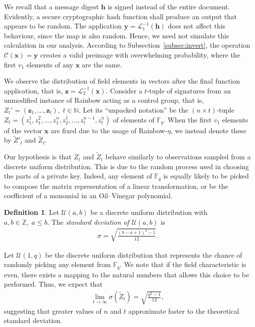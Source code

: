 \documentclass[12pt, a4paper, oneside]{memoir}
\theoremstyle{definition}
\newtheorem{definition}[theorem]{Definition}
\begin{document}
We recall that a message digest $\mathbf{h}$ is signed instead of the entire document. Evidently, a secure cryptographic hash function shall produce an output that appears to be random. The application $\mathbf{y} = \mathcal{L}_{1}^{-1}(\mathbf{h})$ does not affect this behaviour, since the map is also random. Hence, we need not simulate this calculation in our analysis. According to Subsection~\ref{subsec:invert}, the operation $\mathcal{C}(\mathbf{x}) = \mathbf{y}$ creates a valid preimage with overwhelming probability, where the first $v_{1}$ elements of any $\mathbf{x}$ are the same.

We observe the distribution of field elements in vectors after the final function application, that is, $\mathbf{z} = \mathcal{L}_{2}^{-1}(\mathbf{x})$. Consider a $t$-tuple of signatures from an unmodified instance of Rainbow acting as a control group, that is, $Z_{t}' = (\mathbf{z}_{1}, \dots, \mathbf{z}_{t}),\; t \in \mathbb{N}$. Let its ``unpacked notation'' be the $(n \times t)$-tuple $Z_{t} = (z_{1}^{1}, z_{1}^{2}, \dots, z_{1}^{n}, z_{2}^{1}, \dots, z_{t}^{n - 1}, z_{t}^{n})$ of elements of $\mathbb{F}_{q}$. When the first $v_{1}$ elements of the vector $\mathbf{x}$ are fixed due to the usage of Rainbow-$\eta$, we instead denote these by $\widetilde{Z}'_{t}$ and $\widetilde{Z}_{t}$. 

Our hypothesis is that $Z_{t}$ and $\widetilde{Z}_{t}$ behave similarly to observations sampled from a discrete uniform distribution. This is due to the random process used in choosing the parts of a private key. Indeed, any element of $\mathbb{F}_{q}$ is equally likely to be picked to compose the matrix representation of a linear transformation, or be the coefficient of a monomial in an Oil--Vinegar polynomial.

\begin{definition}
  Let $\mathcal{U}(a, b)$ be a discrete uniform distribution with $a, b \in \mathbb{Z},\; a \leq b$. The \emph{standard deviation of $\mathcal{U}(a, b)$} is
  \begin{align}
    \sigma = \sqrt{\frac{(b - a + 1)^{2} - 1}{12}}.
  \end{align}
\end{definition}

Let $\mathcal{U}(1, q)$ be the discrete uniform distribution that represents the chance of randomly picking any element from $\mathbb{F}_{q}$. We note that if the field characteristic is even, there exists a mapping to the natural numbers that allows this choice to be performed. Thus, we expect that
\begin{align}
  \lim_{t \to \infty} \sigma(\widetilde{Z}_{t}) = \sqrt{\frac{q^{2} - 1}{12}},
\end{align}
suggesting that greater values of $n$ and $t$ approximate faster to the theoretical standard deviation.
\end{document}
